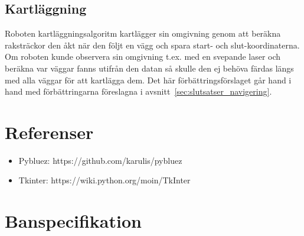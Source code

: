 \documentclass{article}
\begin{document}
\subsection{Kartläggning}
Roboten kartläggningsalgoritm kartlägger sin omgivning genom att beräkna raksträckor den åkt när den följt en vägg och spara start- och slut-koordinaterna. Om roboten kunde observera sin omgivning t.ex. med en svepande laser och beräkna var väggar fanns utifrån den datan så skulle den ej behöva färdas längs med alla väggar för att kartlägga dem. Det här förbättringsförslaget går hand i hand med förbättringarna föreslagna i avsnitt~\ref{sec:slutsatser_navigering}.

\clearpage
\section{Referenser}
\begin{itemize}
    \item Pybluez: https://github.com/karulis/pybluez
    \item Tkinter: https://wiki.python.org/moin/TkInter
\end{itemize}

\appendix
\clearpage
\section{Banspecifikation}
\label{sec:banspec}

\end{document}
